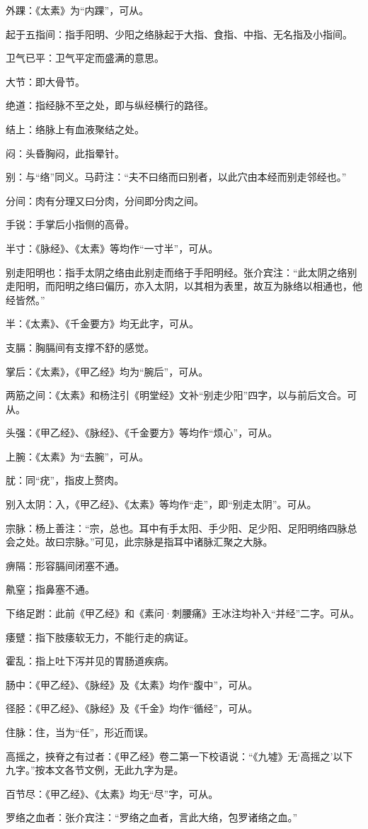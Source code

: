 \documentclass[12pt]{ctexbook}%
\begin{document}

\begin{jiaozhu}
	\item 外踝：《太素》为“内踝”，可从。
	\item 起于五指间：指手阳明、少阳之络脉起于大指、食指、中指、无名指及小指间。
	\item 卫气已平：卫气平定而盛满的意思。
	\item 大节：即大骨节。
	\item 绝道：指经脉不至之处，即与纵经横行的路径。
	\item 结上：络脉上有血液聚结之处。
	\item 闷：头昏胸闷，此指晕针。
	\item 别：与“络”同义。马莳注：“夫不曰络而曰别者，以此穴由本经而别走邻经也。”
	\item 分间：肉有分理又曰分肉，分间即分肉之间。
	\item 手锐：手掌后小指侧的高骨。
	\item 半寸：《脉经》、《太素》等均作“一寸半”，可从。
	\item 别走阳明也：指手太阴之络由此别走而络于手阳明经。张介宾注：“此太阴之络别走阳明，而阳明之络曰偏历，亦入太阴，以其相为表里，故互为脉络以相通也，他经皆然。”
	\item 半：《太素》、《千金要方》均无此字，可从。
	\item 支膈：胸膈间有支撑不舒的感觉。
	\item 掌后：《太素》，《甲乙经》均为“腕后”，可从。
	\item 两筋之间：《太素》和杨注引《明堂经》文补“别走少阳”四字，以与前后文合。可从。
	\item 头强：《甲乙经》、《脉经》、《千金要方》等均作“烦心”，可从。
	\item 上腕：《太素》为“去腕”，可从。
	\item 肬：同“疣”，指皮上赘肉。
	\item 别入太阴：入，《甲乙经》、《太素》等均作“走”，即“别走太阴”。可从。
	\item 宗脉：杨上善注：“宗，总也。耳中有手太阳、手少阳、足少阳、足阳明络四脉总会之处。故曰宗脉。”可见，此宗脉是指耳中诸脉汇聚之大脉。
	\item 痹隔：形容膈间闭塞不通。
	\item 鼽窒；指鼻塞不通。
	\item 下络足跗：此前《甲乙经》和《素问·刺腰痛》王冰注均补入“并经”二字。可从。
	\item 痿躄：指下肢痿软无力，不能行走的病证。
	\item 霍乱：指上吐下泻并见的胃肠道疾病。
	\item 肠中：《甲乙经》、《脉经》及《太素》均作“腹中”，可从。
	\item 径胫：《甲乙经》、《脉经》及《千金》均作“循经”，可从。
	\item 住脉：住，当为“任”，形近而误。
	\item 高摇之，挾脊之有过者：《甲乙经》卷二第一下校语说：“《九墟》无‘高摇之’以下九字。”按本文各节文例，无此九字为是。
	\item 百节尽：《甲乙经》、《太素》均无“尽”字，可从。
	\item 罗络之血者：张介宾注：“罗络之血者，言此大络，包罗诸络之血。”
\end{jiaozhu}
\end{document}
